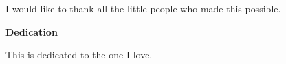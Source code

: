 I would like to thank all the little people who made this possible.
\cleardoublepage


\begin{center}\textbf{Dedication}\end{center}

This is dedicated to the one I love.
\cleardoublepage

\renewcommand\contentsname{Table of Contents}
\tableofcontents
\cleardoublepage
{}


\listoffigures
\cleardoublepage
{}		%



